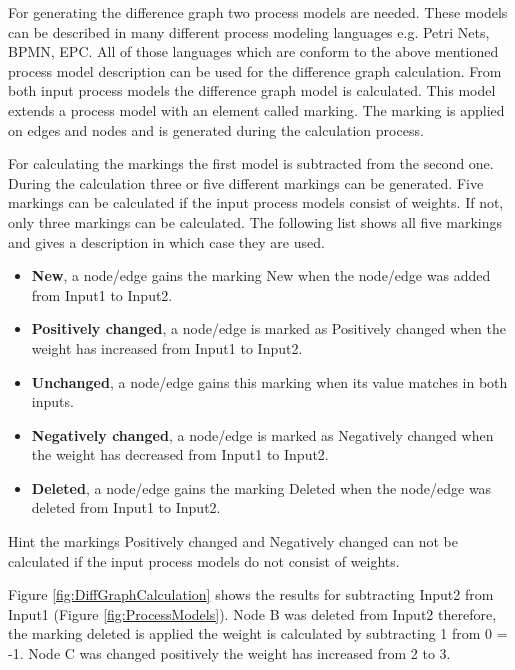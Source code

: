 \documentclass{llncs}
\begin{document}

For generating the difference graph two process models are needed. These models can be described in many different process modeling languages e.g. Petri Nets, BPMN, EPC. All of those languages which are conform to the above mentioned process model description can be used for the difference graph calculation. From both input process models the difference graph model is calculated. This model extends a process model with an element called marking. The marking is applied on edges and nodes and is generated during the calculation process.


For calculating the markings the first model is subtracted from the second one. During the calculation three or five different markings can be generated. Five markings can be calculated if the input process models consist of weights. If not, only three markings can be calculated. The following list shows all five markings and gives a description in which case they are used. 

\begin{itemize}
	\item \textbf{New}, a node/edge gains the marking New when the node/edge was added from Input1 to Input2.
	\item \textbf{Positively changed}, a node/edge is marked as Positively changed when the weight has increased from Input1 to Input2.
	\item \textbf{Unchanged}, a node/edge gains this marking when its value matches in both inputs.
	\item \textbf{Negatively changed}, a node/edge is marked as Negatively changed when the weight has decreased from Input1 to Input2.
	\item \textbf{Deleted}, a node/edge gains the marking Deleted when the node/edge was deleted from Input1 to Input2.
\end{itemize}

Hint the markings Positively changed and Negatively changed can not be calculated if the input process models do not consist of weights.

Figure \ref{fig:DiffGraphCalculation} shows the results for subtracting Input2 from Input1 (Figure \ref{fig:ProcessModels}). Node B  was deleted from Input2 therefore, the marking deleted is applied the weight is calculated by subtracting 1 from 0 = -1. Node C was changed positively the weight has increased from 2 to 3.
\end{document}
